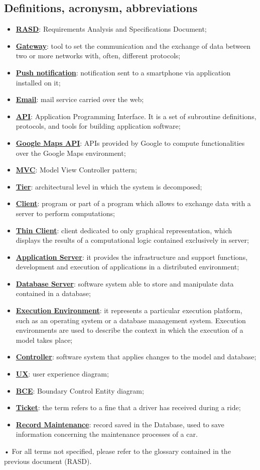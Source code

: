 \documentclass[10pt, a4paper,titlepage]{article}
\begin{document}
\subsection{Definitions, acronysm, abbreviations}
\begin{itemize}
\item \underline{\textbf{RASD}}: Requirements Analysis and Specifications Document;
\item \underline{\textbf{Gateway}}: tool to set the communication and the exchange of data between two or more networks with, often, different protocols;
\item \underline{\textbf{Push notification}}: notification sent to a smartphone via application installed on it;
\item \underline{\textbf{Email}}: mail service carried over the web;
\item \underline{\textbf{API}}: Application Programming Interface.  It is a set of subroutine definitions, protocols, and tools for building application software;
\item \underline{\textbf{Google Maps API}}: APIs provided by Google to compute functionalities over the Google Maps environment;
\item \underline{\textbf{MVC}}: Model View Controller pattern;
\item \underline{\textbf{Tier}}: architectural level in which the system is decomposed;
\item \underline{\textbf{Client}}: program or part of a program which allows to exchange data with a server to perform computations;
\item \underline{\textbf{Thin Client}}: client dedicated to only graphical representation, which displays the results of a computational logic contained exclusively in server;
\item \underline{\textbf{Application Server}}: it provides the infrastructure and support functions, development and execution of applications in a distributed environment;
\item \underline{\textbf{Database Server}}: software system able to store and manipulate data contained in a database;
\item \underline{\textbf{Execution Environment}}: it represents a particular execution platform, such as an operating system or a database management system. Execution environments are used to describe the context in which the execution of a model takes place;
\item \underline{\textbf{Controller}}: software system that applies changes to the model and database;
\item \underline{\textbf{UX}}: user experience diagram;
\item \underline{\textbf{BCE}}: Boundary Control Entity diagram;
\item \underline{\textbf{Ticket}}: the term refers to a fine that a driver has received during a ride;
\item \underline{\textbf{Record Maintenance}}: record saved in the Database, used to save information concerning the maintenance processes of a car.
\end{itemize}•
For all terms not specified, please refer to the glossary contained in the previous document (RASD).
\end{document}
